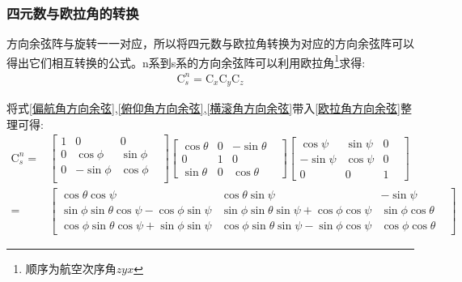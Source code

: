 \subsubsection{四元数与欧拉角的转换}\label{section:四元数与欧拉角的转换}
方向余弦阵与旋转一一对应\citep{方向余弦阵}，所以将四元数与欧拉角转换为对应的方向余弦阵可以得出它们相互转换的公式。n系到s系的方向余弦阵可以利用欧拉角\footnote{顺序为航空次序角$zyx$}\citep{捷联惯导航}求得:
\begin{equation}\label{欧拉角方向余弦}
    \begin{split} 
        \mathrm{C}^n_s=\mathrm{C}_x\mathrm{C}_y\mathrm{C}_z
    \end{split}
\end{equation} 

将式\ref{偏航角方向余弦},\ref{俯仰角方向余弦},\ref{横滚角方向余弦}带入\ref{欧拉角方向余弦}整理可得:
\begin{equation}\label{欧拉角n转s}
    \begin{split} 
        \mathrm{C}^n_s=&\left[\begin{matrix}
                1 &           0 &          0 & \\
                0 &  \cos{\phi} & \sin{\phi} & \\
                0 & -\sin{\phi} & \cos{\phi} & \\
                \end{matrix}\right]
                \left[\begin{matrix}
                \cos{\theta} & 0 & -\sin{\theta} & \\
                           0 & 1 &           0 & \\
                \sin{\theta} & 0 &  \cos{\theta} &
                \end{matrix}\right]
                \left[\begin{matrix}
                 \cos{\psi} & \sin{\psi} & 0 & \\
                -\sin{\psi} & \cos{\psi} & 0 & \\
                          0 &          0 & 1 &
                \end{matrix}\right] \\
                =&\left[\begin{matrix}
                \cos{\theta}\cos{\psi} & \cos{\theta}\sin{\psi} & -\sin{\psi} & \\
                \sin{\phi}\sin{\theta}\cos{\psi}-\cos{\phi}\sin{\psi} & \sin{\phi}\sin{\theta}\sin{\psi}+\cos{\phi}\cos{\psi} & \sin{\phi}\cos{\theta} & \\
                \cos{\phi}\sin{\theta}\cos{\psi}+\sin{\phi}\sin{\psi} & \cos{\phi}\sin{\theta}\sin{\psi}-\sin{\phi}\cos{\psi} & \cos{\phi}\cos{\theta} &
                \end{matrix}\right]
    \end{split}
\end{equation} 


